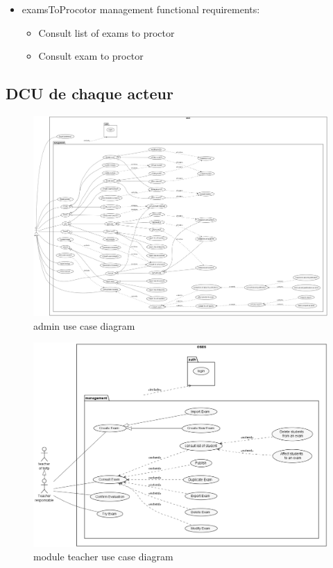 \documentclass[a4paper,12p]{article}
\begin{document}
\begin{itemize}
        \item{examsToProcotor management functional requirements:}
        \begin{itemize}
            \item Consult list of exams to proctor
            \item Consult exam to proctor
        \end{itemize}
    \end{itemize}

    \clearpage
    \subsection{DCU de chaque acteur}

    \begin{figure}[h]
        \centering
        \includegraphics[width=\textwidth]{admin_UCD}
        \caption{admin use case diagram}
    \end{figure}

    \begin{figure}[h]
        \centering
        \includegraphics[width=\textwidth]{Module_Teacher}
        \caption{module teacher use case diagram}
    \end{figure}
\end{document}
